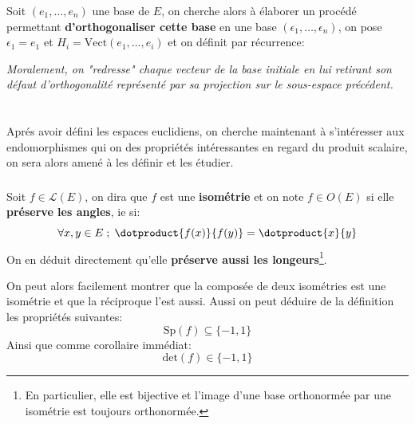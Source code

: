 \subsection*{}
Soit \((e_1, \ldots, e_n)\) une base de \(E\), on cherche alors à élaborer un procédé permettant \textbf{d'orthogonaliser cette base} en une base \((\epsilon_1, \ldots, \epsilon_n)\), on pose \(\epsilon_1 = e_1\) et \(H_i = \text{Vect}(e_1, \ldots, e_i)\) et on définit par récurrence:

\begin{center}
   \textit{Moralement, on "redresse" chaque vecteur de la base initiale en lui retirant son défaut d'orthogonalité représenté par sa projection sur le sous-espace précédent.}
\end{center}

\chapter*{}
Aprés avoir défini les espaces euclidiens, on cherche maintenant à s'intéresser aux endomorphismes qui on des propriétés intéressantes en regard du produit scalaire, on sera alors amené à les définir et les étudier.


\subsection*{}
Soit \(f \in \mathcal{L}(E)\), on dira que \(f\) est une \textbf{isométrie} et on note \(f \in O(E)\) si elle \textbf{préserve les angles}, ie si:
\[
   \forall x, y \in E \; ; \; \dotproduct{f(x)}{f(y)} = \dotproduct{x}{y}   
\]
On en déduit directement qu'elle \textbf{préserve aussi les longeurs}\footnote[1]{En particulier, elle est bijective et l'image d'une base orthonormée par une isométrie est toujours orthonormée.}.\<

On peut alors facilement montrer que la composée de deux isométries est une isométrie et que la réciproque l'est aussi. Aussi on peut déduire de la définition les propriétés suivantes:
\[
   \text{Sp}(f) \subseteq \{-1, 1\}   
\]
Ainsi que comme corollaire immédiat:
\[
   \text{det}(f) \in \{-1, 1\}
\]
